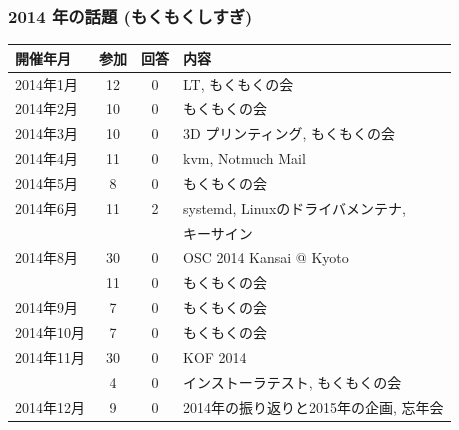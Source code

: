 \documentclass[cjk,dvipdfmx,10pt,compress,%
hyperref={bookmarks=true,bookmarksnumbered=true,bookmarksopen=false,%
colorlinks=false,%
pdftitle={第 121 回 関西 Debian 勉強会},%
pdfauthor={倉敷・のがた・佐々木・かわだ},%
pdfsubject={資料},%
}]{beamer}
\begin{document}
\begin{frame}[fragile]
  \frametitle{2014 年の話題 (もくもくしすぎ) }
    \begin{table}
        \begin{center}
          \begin{tabular}{|l|c|c|p{20em}|}
            \hline
            開催年月  & 参加 & 回答 & 内容 \\
            \hline
            2014年1月 &12    &0     & LT, もくもくの会 \\
            2014年2月 &10    &0     & もくもくの会 \\
            2014年3月 &10    &0     & 3D プリンティング, もくもくの会 \\
            2014年4月 &11    &0     & kvm, Notmuch Mail \\
            2014年5月 & 8    &0     & もくもくの会 \\
            2014年6月 &11    &2     & systemd, Linuxのドライバメンテナ, \\
                      &      &      & キーサイン \\
            2014年8月 &30    &0     & OSC 2014 Kansai @ Kyoto \\
                      &11    &0     & もくもくの会 \\
            2014年9月 & 7    &0     & もくもくの会 \\
            2014年10月& 7    &0     & もくもくの会 \\
            2014年11月&30    &0     & KOF 2014 \\
                      & 4    &0     & インストーラテスト, もくもくの会 \\
            2014年12月& 9    &0     & 2014年の振り返りと2015年の企画, 忘年会 \\
            \hline
          \end{tabular}
        \end{center}
    \end{table}
\end{frame}
\end{document}
